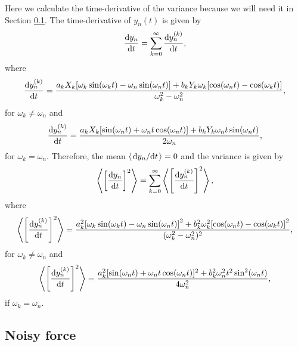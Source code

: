 Here we calculate the time-derivative of the variance because we will need it in Section \ref{sec:noisy_force}. The time-derivative of $y_n(t)$ is given by
\begin{equation}
    \dv{y_n}{t} = \sum_{k=0}^\infty\dv{y_n^{(k)}}{t},
\end{equation}
where
\begin{equation}
    \dv{y_n^{(k)}}{t} = \frac{a_k X_k\qty[\omega_k\sin(\omega_k t) - \omega_n\sin(\omega_n t) ] + b_k Y_k \omega_k\qty[\cos(\omega_n t) - \cos(\omega_k t)]}{\omega_k^2 - \omega_n^2},
\end{equation}
for $\omega_k\ne \omega_n$ and
\begin{equation}
    \label{eq:variance_d_velocity_dt}
    \dv{y_n^{(k)}}{t} = \frac{a_k X_k [\sin(\omega_n t) + \omega_n t \cos(\omega_n t)]+ b_k Y_k \omega_n t \sin(\omega_n t)}{2\omega_n},
\end{equation}
for $\omega_k = \omega_n$. Therefore, the mean $\langle \dv*{y_n}{t} \rangle = 0$ and the variance is given by
\begin{equation}
    \left\langle \qty[\dv{y_n}{t}]^2 \right\rangle = \sum_{k=0}^\infty \left\langle \qty[\dv{y_n^{(k)}}{t}]^2 \right\rangle,
\end{equation}
where
\begin{equation}
    \left\langle \qty[\dv{y_n^{(k)}}{t}]^2 \right\rangle = \frac{a_k^2\qty[\omega_k\sin(\omega_k t) - \omega_n\sin(\omega_n t)]^2 + b_k^2\omega_k^2 \qty[\cos(\omega_n t) - \cos(\omega_k t)]^2}{(\omega_k^2 - \omega_n^2)^2},
\end{equation}
for $\omega_k\ne\omega_n$ and
\begin{equation}
   \left\langle \qty[\dv{y_n^{(k)}}{t}]^2 \right\rangle = \frac{a_k^2 [\sin(\omega_n t) + \omega_n t \cos(\omega_n t)]^2+ b_k^2  \omega_n^2 t^2 \sin^2(\omega_n t)}{4\omega_n^2},
\end{equation}
if $\omega_k=\omega_n$.

\subsection{Noisy force}
\label{sec:noisy_force}

